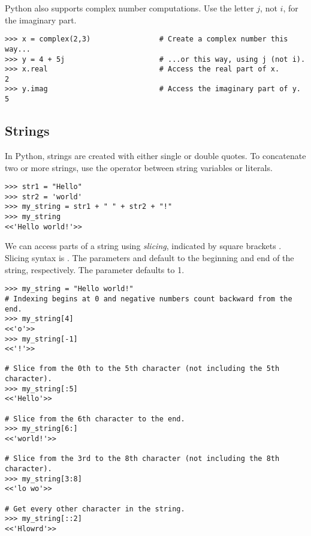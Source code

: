 Python also supports complex number computations.
Use the letter $j$, not $i$, for the imaginary part.
\begin{lstlisting}
>>> x = complex(2,3)                # Create a complex number this way...
>>> y = 4 + 5j	                    # ...or this way, using j (not i).
>>> x.real                          # Access the real part of x.
2
>>> y.imag                          # Access the imaginary part of y.
5
\end{lstlisting}

\subsection*{Strings} %

In Python, strings are created with either single or double quotes.
To concatenate two or more strings, use the \li{+} operator between string variables or literals.
\begin{lstlisting}
>>> str1 = "Hello"
>>> str2 = 'world'
>>> my_string = str1 + " " + str2 + "!"
>>> my_string
<<'Hello world!'>>
\end{lstlisting}

We can access parts of a string using \emph{slicing}, indicated by square brackets \li{[ ]}.
Slicing syntax is .
The parameters  and  default to the beginning and end of the string, respectively.
The parameter  defaults to 1.

\begin{lstlisting}
>>> my_string = "Hello world!"
# Indexing begins at 0 and negative numbers count backward from the end.
>>> my_string[4]
<<'o'>>
>>> my_string[-1]
<<'!'>>

# Slice from the 0th to the 5th character (not including the 5th character).
>>> my_string[:5]
<<'Hello'>>

# Slice from the 6th character to the end.
>>> my_string[6:]
<<'world!'>>

# Slice from the 3rd to the 8th character (not including the 8th character).
>>> my_string[3:8]
<<'lo wo'>>

# Get every other character in the string.
>>> my_string[::2]
<<'Hlowrd'>>
\end{lstlisting}


